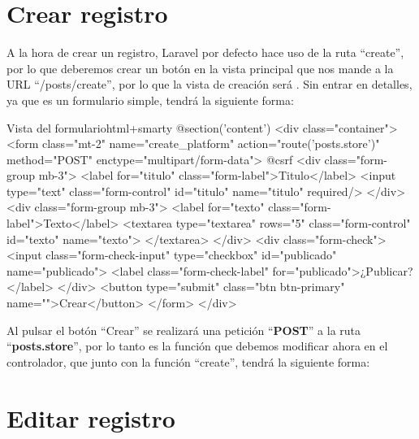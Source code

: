 \chapter{Crear registro}

A la hora de crear un registro, Laravel por defecto hace uso de la ruta “create”, por lo que deberemos crear un botón en la vista principal que nos mande a la URL “/posts/create”, por lo que la vista de creación será . Sin entrar en detalles, ya que es un formulario simple, tendrá la siguiente forma:

\begin{mycode}{Vista del formulario}{html+smarty}{{\footnotesize }}
@section('content')
<div class="container">
  <form class="mt-2" name="create_platform" action="{{route('posts.store')}}"
    method="POST" enctype="multipart/form-data">
    @csrf
    <div class="form-group mb-3">
      <label for="titulo" class="form-label">Titulo</label>
      <input type="text" class="form-control" id="titulo" name="titulo" required/>
    </div>
    <div class="form-group mb-3">
      <label for="texto" class="form-label">Texto</label>
      <textarea type="textarea" rows="5" class="form-control" id="texto" name="texto">
      </textarea>
    </div>
    <div class="form-check">
      <input class="form-check-input" type="checkbox" id="publicado" name="publicado">
      <label class="form-check-label" for="publicado">¿Publicar?
      </label>
    </div>
  <button type="submit" class="btn btn-primary" name="">Crear</button>
</form>
</div>
\end{mycode}

Al pulsar el botón “Crear” se realizará una petición “\textbf{POST}” a la ruta “\textbf{posts.store}”, por lo tanto es la función que debemos modificar ahora en el controlador, que junto con la función “create”, tendrá la siguiente forma:



\chapter{Editar registro}


